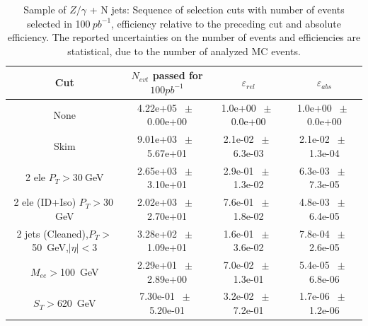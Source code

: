 \begin{table}[htbp] 
\begin{center} 
\begin{tabular}{|c|c|c|c|} 
\hline\hline 
 Cut & $N_{evt}$ passed for $100pb^{-1}$ & $\varepsilon_{rel}$ & $\varepsilon_{abs}$ \\ 
\hline\hline 
None       &        4.22e+05       $~\pm~$       0.00e+00        &        1.0e+00       $~\pm~$       0.0e+00        &        1.0e+00       $~\pm~$       0.0e+00       \\       
       Skim       &        9.01e+03       $~\pm~$       5.67e+01        &        2.1e-02       $~\pm~$       6.3e-03        &        2.1e-02       $~\pm~$       1.3e-04       \\       
       2 ele $P_T>30~$GeV       &        2.65e+03       $~\pm~$       3.10e+01        &        2.9e-01       $~\pm~$       1.3e-02        &        6.3e-03       $~\pm~$       7.3e-05       \\       
       2 ele (ID+Iso) $P_T>30~$GeV       &        2.02e+03       $~\pm~$       2.70e+01        &        7.6e-01       $~\pm~$       1.8e-02        &        4.8e-03       $~\pm~$       6.4e-05       \\       
       2 jets (Cleaned),$P_T>$50~GeV,$|\eta|<$3       &        3.28e+02       $~\pm~$       1.09e+01        &        1.6e-01       $~\pm~$       3.6e-02        &        7.8e-04       $~\pm~$       2.6e-05       \\       
       $M_{ee}>$100~GeV       &        2.29e+01       $~\pm~$       2.89e+00        &        7.0e-02       $~\pm~$       1.3e-01        &        5.4e-05       $~\pm~$       6.8e-06       \\       
       $S_T>$620~GeV       &        7.30e-01       $~\pm~$       5.20e-01        &        3.2e-02       $~\pm~$       7.2e-01        &        1.7e-06       $~\pm~$       1.2e-06       \\       
          \hline\hline 
\end{tabular} 
\end{center} 
\caption{Sample of $Z/\gamma$ + N jets: Sequence of selection cuts with number of events selected in 100$~pb^{-1}$, efficiency relative to the preceding cut and absolute efficiency.  The reported uncertainties on the number of events and efficiencies are statistical, due to the number of analyzed MC events.} 
\label{tab:effic-Z} 
\end{table} 

